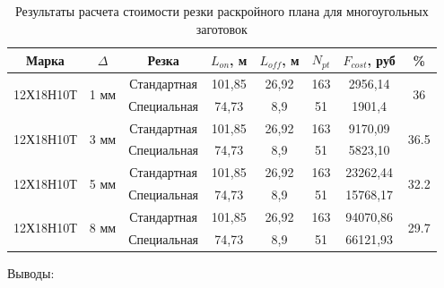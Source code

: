 \documentclass[11pt,twoside]{report}
\begin{document}
\begin{table}
  \caption{Результаты расчета стоимости резки раскройного плана для многоугольных заготовок}
  \label{polygons}
  \begin{tabular}{cccccccc}
    \hline
    Марка & $\Delta$ & Резка & $L_{on}$, м & $L_{off}$, м & $N_{pt}$ & $F_{cost}$, руб & \% \\
    \hline
    \multirow{2}{*}{12Х18Н10Т} & \multirow{2}{*}{1 мм} & Стандартная & 101,85 & 26,92 & 163 & 2956,14 & \multirow{2}{*}{36} \\
    & & Специальная & 74,73 & 8,9 & 51 & 1901,4 \\
    \multirow{2}{*}{12Х18Н10Т} & \multirow{2}{*}{3 мм} & Стандартная & 101,85 &	26,92 & 163 & 9170,09 & \multirow{2}{*}{36.5} \\
    & & Специальная & 74,73 & 8,9 & 51 & 5823,10 \\
    \multirow{2}{*}{12Х18Н10Т} & \multirow{2}{*}{5 мм} & Стандартная & 101,85 & 26,92 & 163 & 23262,44 & \multirow{2}{*}{32.2} \\
    & & Специальная & 74,73 & 8,9 & 51 & 15768,17 \\
    \multirow{2}{*}{12Х18Н10Т} & \multirow{2}{*}{8 мм} & Стандартная & 101,85 & 26,92 & 163 & 94070,86 & \multirow{2}{*}{29.7} \\
    & & Специальная & 74,73 & 8,9 & 51 & 66121,93 \\
  \end{tabular}
\end{table}

Выводы:
\end{document}
